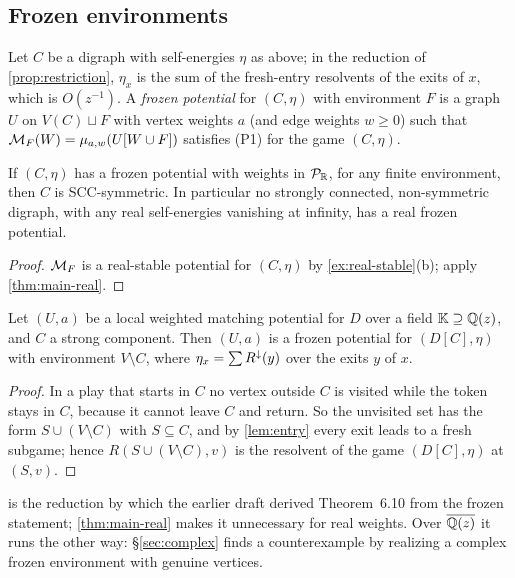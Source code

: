 \subsection{Frozen environments}
Let $C$ be a digraph with self-energies $\eta$ as above; in the reduction of \cref{prop:restriction}, $\eta_x$ is the sum of the fresh-entry resolvents of the exits of $x$, which is $O(z^{-1})$. A \emph{frozen potential} for $(C,\eta)$ with environment $F$ is a graph $U$ on $V(C)\sqcup F$ with vertex weights $a$ (and edge weights $w\ge0$) such that $\mathcal{M}_F(W)=\mu_{a,w}(U[W\cup F])$ satisfies \textup{(P1)} for the game $(C,\eta)$.

\begin{theorem}\label{thm:frozen-real}
If $(C,\eta)$ has a frozen potential with weights in $\mathcal{P}_{\mathbb{R}}$, for any finite environment, then $C$ is SCC-symmetric. In particular no strongly connected, non-symmetric digraph, with any real self-energies vanishing at infinity, has a real frozen potential.
\end{theorem}
\begin{proof}
$\mathcal{M}_F$ is a real-stable potential for $(C,\eta)$ by \cref{ex:real-stable}(b); apply \cref{thm:main-real}.
\end{proof}

\begin{proposition}\label{prop:restriction}
Let $(U,a)$ be a local weighted matching potential for $D$ over a field $\mathbb K\supseteq\mathbb{Q}(z)$, and $C$ a strong component. Then $(U,a)$ is a frozen potential for $(D[C],\eta)$ with environment $V\setminus C$, where $\eta_x=\sum R^{\downarrow}(y)$ over the exits $y$ of $x$.
\end{proposition}
\begin{proof}
In a play that starts in $C$ no vertex outside $C$ is visited while the token stays in $C$, because it cannot leave $C$ and return. So the unvisited set has the form $S\cup(V\setminus C)$ with $S\subseteq C$, and by \cref{lem:entry} every exit leads to a fresh subgame; hence $R(S\cup(V\setminus C),v)$ is the resolvent of the game $(D[C],\eta)$ at $(S,v)$.
\end{proof}

 is the reduction by which the earlier draft derived Theorem~6.10 from the frozen statement; \cref{thm:main-real} makes it unnecessary for real weights. Over $\overline{\mathbb{Q}(z)}$ it runs the other way: \S\ref{sec:complex} finds a counterexample by realizing a complex frozen environment with genuine vertices.

